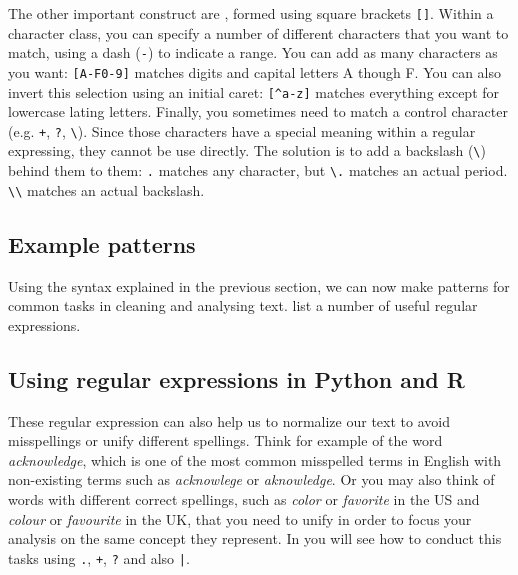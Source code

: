 The other important construct are , formed using square brackets \verb|[]|.
Within a character class, you can specify a number of different characters that you want to match, using a dash (\verb|-|) to indicate a range.
You can add as many characters as you want: \verb|[A-F0-9]| matches digits and capital letters A though F.
You can also invert this selection using an initial caret: \verb|[^a-z]| matches everything except for lowercase lating letters.
Finally, you sometimes need to match a control character  (e.g. \verb!+!, \verb|?|, \verb|\|). Since those characters have a special meaning within a regular expressing, they cannot be use directly. The solution is to add a backslash (\verb|\|) behind them to  them:
\verb|.| matches any character, but \verb|\.| matches an actual period. \verb|\\| matches an actual backslash.

\subsection{Example patterns}

Using the syntax explained in the previous section, we can now make patterns for common tasks in cleaning and analysing text.
 list a number of useful regular expressions. 



\subsection{Using regular expressions in Python and R}


These regular expression can also help us to normalize our text to avoid misspellings or unify different spellings. Think for example of the word \emph{acknowledge}, which is one of the most common misspelled terms in English with non-existing terms such as \emph{acknowlege} or \emph{aknowledge}. Or you may also think of words with different correct spellings, such as \emph{color} or \emph{favorite} in the US and \emph{colour} or \emph{favourite} in the UK, that you need to unify in order to focus your analysis on the same concept they represent. In  you will see how to conduct this tasks using \verb+.+, \verb|+|, \verb+?+ and also \verb+|+.


